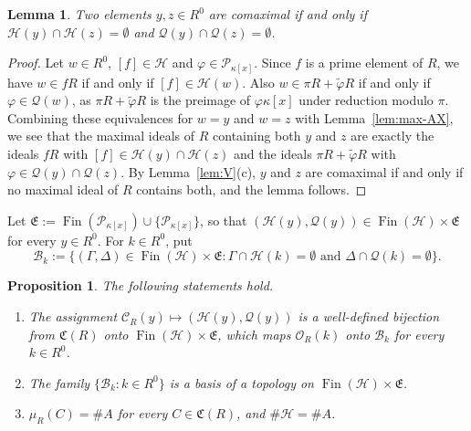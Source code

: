 \documentclass[12pt,reqno,a4paper]{amsart}
\newcommand{\Pe}{\mathcal{P}}
\DeclareMathOperator{\Fin}{Fin}
\theoremstyle{plain}
\newtheorem{proposition}[theorem]{Proposition}
\newtheorem{lemma}[theorem]{Lemma}
\theoremstyle{definition}
\begin{document}
\begin{lemma}\label{lem:comax-AX}
Two elements $y,z\in R^0$ are comaximal if and only if $\mathcal{H}(y)\cap\mathcal{H}(z)=\emptyset$ and $\mathcal{Q}(y)\cap\mathcal{Q}(z)=\emptyset$.
\end{lemma}
\begin{proof}
Let $w\in R^0$, $[f]\in\mathcal{H}$ and $\varphi\in\Pe_{\kappa[x]}$. Since $f$ is a prime element of $R$, we have $w\in fR$ if and only if $[f]\in\mathcal{H}(w)$. Also $w\in\pi R+\tilde\varphi R$ if and only if $\varphi\in\mathcal{Q}(w)$, as $\pi R+\tilde\varphi R$ is the preimage of $\varphi\kappa[x]$ under reduction modulo $\pi$. Combining these equivalences for $w=y$ and $w=z$ with Lemma~\ref{lem:max-AX}, we see that the maximal ideals of $R$ containing both $y$ and $z$ are exactly the ideals $fR$ with $[f]\in\mathcal{H}(y)\cap\mathcal{H}(z)$ and the ideals $\pi R+\tilde\varphi R$ with $\varphi\in\mathcal{Q}(y)\cap\mathcal{Q}(z)$. By Lemma~\ref{lem:V}(c), $y$ and $z$ are comaximal if and only if no maximal ideal of $R$ contains both, and the lemma follows. 
\end{proof}
Let $\mathfrak{E}:=\Fin(\Pe_{\kappa[x]})\cup\{\Pe_{\kappa[x]}\}$, so that $(\mathcal{H}(y),\mathcal{Q}(y))\in\Fin(\mathcal{H})\times\mathfrak{E}$ for every $y\in R^0$. For $k\in R^0$, put
\[
\mathcal{B}_k:=\{(\Gamma,\Delta)\in\Fin(\mathcal{H})\times\mathfrak{E}:\Gamma\cap\mathcal{H}(k)=\emptyset\text{ and }\Delta\cap\mathcal{Q}(k)=\emptyset\}.
\]
\begin{proposition}\label{prop:param-AX}
The following statements hold.
\begin{enumerate}[label=\textup{(\roman*)}]
\item The assignment $\mathcal{C}_R(y)\mapsto(\mathcal{H}(y),\mathcal{Q}(y))$ is a well-defined bijection from $\mathfrak{C}(R)$ onto $\Fin(\mathcal{H})\times\mathfrak{E}$, which maps $\mathcal{O}_R(k)$ onto $\mathcal{B}_k$ for every $k\in R^0$.
\item The family $\{\mathcal{B}_k:k\in R^0\}$ is a basis of a topology on $\Fin(\mathcal{H})\times\mathfrak{E}$.
\item $\mu_R(C)=\#A$ for every $C\in\mathfrak{C}(R)$, and $\#\mathcal{H}=\#A$.
\end{enumerate}
\end{proposition}
\end{document}
